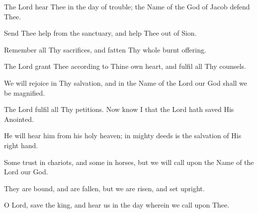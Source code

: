 The Lord hear Thee in the day of trouble; the Name of the God of Jacob defend Thee.

Send Thee help from the sanctuary, and help Thee out of Sion.

Remember all Thy sacrifices, and fatten Thy whole burnt offering.

The Lord grant Thee according to Thine own heart, and fulfil all Thy counsels.

We will rejoice in Thy salvation, and in the Name of the Lord our God shall we be magnified.

The Lord fulfil all Thy petitions. Now know I that the Lord hath saved His Anointed.

He will hear him from his holy heaven; in mighty deeds is the salvation of His right hand.

Some trust in chariots, and some in horses, but we will call upon the Name of the Lord our God.

They are bound, and are fallen, but we are risen, and set upright.

O Lord, save the king, and hear us in the day wherein we call upon Thee.

